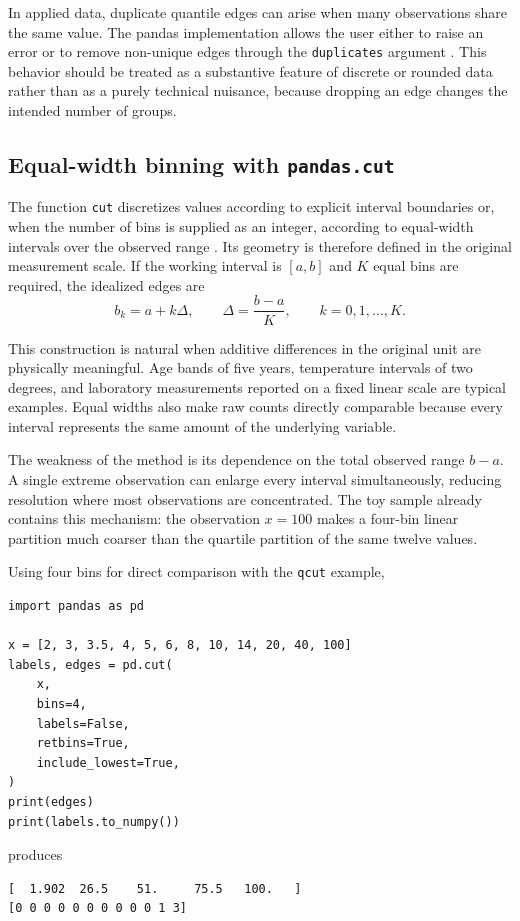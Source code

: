 In applied data, duplicate quantile edges can arise when many observations share the same value. The pandas implementation allows the user either to raise an error or to remove non-unique edges through the \texttt{duplicates} argument \cite{PandasQcut}. This behavior should be treated as a substantive feature of discrete or rounded data rather than as a purely technical nuisance, because dropping an edge changes the intended number of groups.

\subsection{Equal-width binning with \texttt{pandas.cut}}

The function \texttt{cut} discretizes values according to explicit interval boundaries or, when the number of bins is supplied as an integer, according to equal-width intervals over the observed range \cite{PandasCut}. Its geometry is therefore defined in the original measurement scale. If the working interval is $[a,b]$ and $K$ equal bins are required, the idealized edges are
\begin{equation}
 b_k=a+k\Delta,
 \qquad
 \Delta=\frac{b-a}{K},
 \qquad
 k=0,1,\ldots,K.
\label{eq:cut-edges}
\end{equation}

This construction is natural when additive differences in the original unit are physically meaningful. Age bands of five years, temperature intervals of two degrees, and laboratory measurements reported on a fixed linear scale are typical examples. Equal widths also make raw counts directly comparable because every interval represents the same amount of the underlying variable.

The weakness of the method is its dependence on the total observed range $b-a$. A single extreme observation can enlarge every interval simultaneously, reducing resolution where most observations are concentrated. The toy sample already contains this mechanism: the observation $x=100$ makes a four-bin linear partition much coarser than the quartile partition of the same twelve values.

Using four bins for direct comparison with the \texttt{qcut} example,
\begin{lstlisting}[caption={Equal-width binning with pandas.cut.}]
import pandas as pd

x = [2, 3, 3.5, 4, 5, 6, 8, 10, 14, 20, 40, 100]
labels, edges = pd.cut(
    x,
    bins=4,
    labels=False,
    retbins=True,
    include_lowest=True,
)
print(edges)
print(labels.to_numpy())
\end{lstlisting}
produces
\begin{lstlisting}[caption={Output of the equal-width example.},numbers=none]
[  1.902  26.5    51.     75.5   100.   ]
[0 0 0 0 0 0 0 0 0 0 1 3]
\end{lstlisting}

